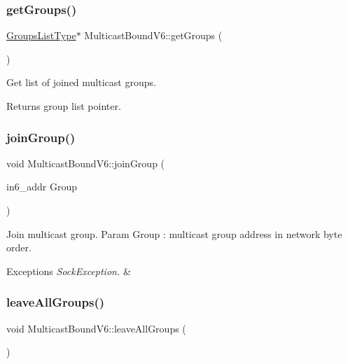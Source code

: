 \subsubsection{\texorpdfstring{get\+Groups()}{getGroups()}}
{\footnotesize\ttfamily \hyperlink{MulticastBound_8h_a9584173a620a338ea7d88264229e36dd}{Groups\+List\+Type}$\ast$ Multicast\+Bound\+V6\+::get\+Groups (\begin{DoxyParamCaption}{ }\end{DoxyParamCaption})\hspace{0.3cm}{\ttfamily [inline]}}

Get list of joined multicast groups. \begin{DoxyReturn}{Returns}
group list pointer. 
\end{DoxyReturn}
\mbox{\label{classMulticastBoundV6_a8ad4a26d4469cc1ffd3f451d4ce8ebd9}} 
\subsubsection{\texorpdfstring{join\+Group()}{joinGroup()}}
{\footnotesize\ttfamily void Multicast\+Bound\+V6\+::join\+Group (\begin{DoxyParamCaption}\item[{in6\+\_\+addr}]{Group }\end{DoxyParamCaption})}

Join multicast group. Param Group \+: multicast group address in network byte order. 
\begin{DoxyExceptions}{Exceptions}
{\em Sock\+Exception.} & \\
\hline
\end{DoxyExceptions}
\mbox{\label{classMulticastBoundV6_a94ea6a1c81af951376b82d23d58a7acd}} 
\subsubsection{\texorpdfstring{leave\+All\+Groups()}{leaveAllGroups()}}
{\footnotesize\ttfamily void Multicast\+Bound\+V6\+::leave\+All\+Groups (\begin{DoxyParamCaption}{ }\end{DoxyParamCaption})}

